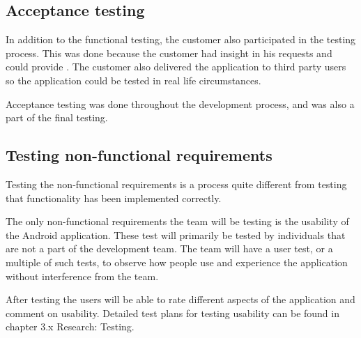 \subsection{Acceptance testing}
In addition to the functional testing, the customer also participated in the testing process. This was done because the customer had insight in his requests and could provide . The customer also delivered the application to third party users so the application could be tested in real life circumstances.

Acceptance testing was done throughout the development process, and was also a part of the final testing.

\subsection{Testing non-functional requirements}
Testing the non-functional requirements is a process quite different from testing that functionality has been implemented correctly.

The only non-functional requirements the team will be testing is the usability of the Android application. These test will primarily be 
tested by individuals that are not a part of the development team. The team will have a user test, or a multiple of such tests, to observe how people use and experience the application without interference from the team. 

After testing the users will be able to rate different aspects of the application and comment on usability. Detailed 
test plans for testing usability can be found in chapter 3.x Research: Testing.